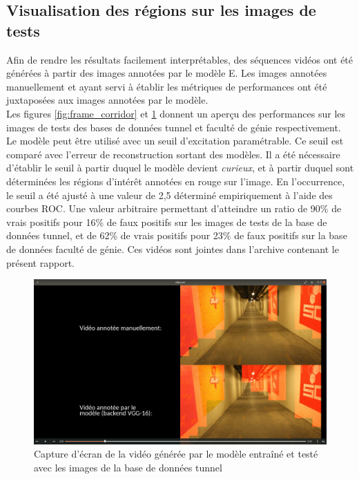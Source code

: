 \subsection{Visualisation des régions sur les images de tests}
    Afin de rendre les résultats facilement interprétables, des séquences vidéos ont été générées à partir des images annotées par le modèle E. Les images annotées manuellement et ayant servi à établir les métriques de performances ont été juxtaposées aux images annotées par le modèle.\\

    Les figures \ref{fig:frame_corridor} et \ref{fig:frame_tunnel} donnent un aperçu des performances sur les images de tests des bases de données tunnel et faculté de génie respectivement. Le modèle peut être utilisé avec un seuil d'excitation paramétrable. Ce seuil est comparé avec l'erreur de reconstruction sortant des modèles. Il a été nécessaire d'établir le seuil à partir duquel le modèle devient \textit{curieux}, et à partir duquel sont déterminées les régions d’intérêt annotées en rouge sur l'image. En l’occurrence, le seuil a été ajusté à une valeur de 2,5 déterminé empiriquement à l'aide des courbes ROC. Une valeur arbitraire permettant d'atteindre un ratio de 90\% de vrais positifs pour 16\% de faux positifs sur les images de tests de la base de données tunnel, et de 62\% de vrais positifs pour 23\% de faux positifs sur la base de données faculté de génie. Ces vidéos sont jointes dans l'archive contenant le présent rapport.\\

    \begin{figure}
        \centering
        \includegraphics[width=17cm]{images/frame_tunnel.png}
        \caption{Capture d'écran de la vidéo générée par le modèle entraîné et testé avec les images de la base de données tunnel}
        \label{fig:frame_tunnel}
    \end{figure}

